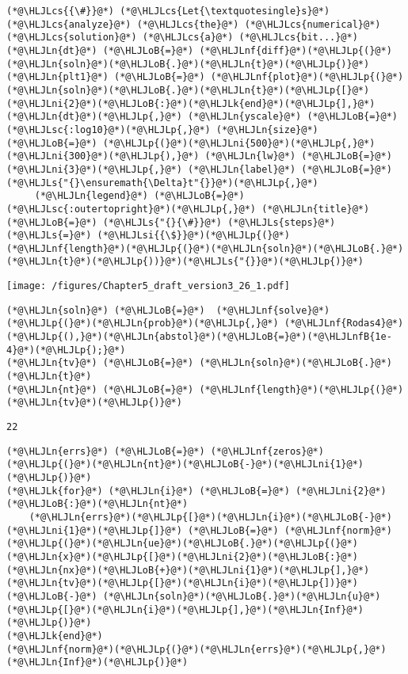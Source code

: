\documentclass[12pt,landscape]{article}
\newcommand{\HLJLk}[1]{\textcolor[RGB]{148,91,176}{\textbf{#1}}}
\newcommand{\HLJLn}[1]{#1}
\newcommand{\HLJLnf}[1]{\textcolor[RGB]{66,102,213}{#1}}
\newcommand{\HLJLs}[1]{\textcolor[RGB]{201,61,57}{#1}}
\newcommand{\HLJLsc}[1]{\textcolor[RGB]{201,61,57}{#1}}
\newcommand{\HLJLsi}[1]{#1}
\newcommand{\HLJLnfB}[1]{\textcolor[RGB]{59,151,46}{#1}}
\newcommand{\HLJLni}[1]{\textcolor[RGB]{59,151,46}{#1}}
\newcommand{\HLJLoB}[1]{\textcolor[RGB]{102,102,102}{\textbf{#1}}}
\newcommand{\HLJLp}[1]{#1}
\newcommand{\HLJLcs}[1]{\textcolor[RGB]{153,153,119}{\textit{#1}}}
\begin{document}
{\begin{lstlisting}
(*@\HLJLcs{{\#}}@*) (*@\HLJLcs{Let{\textquotesingle}s}@*) (*@\HLJLcs{analyze}@*) (*@\HLJLcs{the}@*) (*@\HLJLcs{numerical}@*) (*@\HLJLcs{solution}@*) (*@\HLJLcs{a}@*) (*@\HLJLcs{bit...}@*)
(*@\HLJLn{dt}@*) (*@\HLJLoB{=}@*) (*@\HLJLnf{diff}@*)(*@\HLJLp{(}@*)(*@\HLJLn{soln}@*)(*@\HLJLoB{.}@*)(*@\HLJLn{t}@*)(*@\HLJLp{)}@*)
(*@\HLJLn{plt1}@*) (*@\HLJLoB{=}@*) (*@\HLJLnf{plot}@*)(*@\HLJLp{(}@*)(*@\HLJLn{soln}@*)(*@\HLJLoB{.}@*)(*@\HLJLn{t}@*)(*@\HLJLp{[}@*)(*@\HLJLni{2}@*)(*@\HLJLoB{:}@*)(*@\HLJLk{end}@*)(*@\HLJLp{],}@*) (*@\HLJLn{dt}@*)(*@\HLJLp{,}@*) (*@\HLJLn{yscale}@*) (*@\HLJLoB{=}@*) (*@\HLJLsc{:log10}@*)(*@\HLJLp{,}@*) (*@\HLJLn{size}@*) (*@\HLJLoB{=}@*) (*@\HLJLp{(}@*)(*@\HLJLni{500}@*)(*@\HLJLp{,}@*) (*@\HLJLni{300}@*)(*@\HLJLp{),}@*) (*@\HLJLn{lw}@*) (*@\HLJLoB{=}@*) (*@\HLJLni{3}@*)(*@\HLJLp{,}@*) (*@\HLJLn{label}@*) (*@\HLJLoB{=}@*) (*@\HLJLs{"{}\ensuremath{\Delta}t"{}}@*)(*@\HLJLp{,}@*) 
     (*@\HLJLn{legend}@*) (*@\HLJLoB{=}@*) (*@\HLJLsc{:outertopright}@*)(*@\HLJLp{,}@*) (*@\HLJLn{title}@*) (*@\HLJLoB{=}@*) (*@\HLJLs{"{}{\#}}@*) (*@\HLJLs{steps}@*) (*@\HLJLs{=}@*) (*@\HLJLsi{{\$}}@*)(*@\HLJLp{(}@*)(*@\HLJLnf{length}@*)(*@\HLJLp{(}@*)(*@\HLJLn{soln}@*)(*@\HLJLoB{.}@*)(*@\HLJLn{t}@*)(*@\HLJLp{))}@*)(*@\HLJLs{"{}}@*)(*@\HLJLp{)}@*)
\end{lstlisting}

\texttt{[image: /figures/Chapter5\_draft\_version3\_26\_1.pdf]}

\begin{lstlisting}
(*@\HLJLn{soln}@*) (*@\HLJLoB{=}@*)  (*@\HLJLnf{solve}@*)(*@\HLJLp{(}@*)(*@\HLJLn{prob}@*)(*@\HLJLp{,}@*) (*@\HLJLnf{Rodas4}@*)(*@\HLJLp{(),}@*)(*@\HLJLn{abstol}@*)(*@\HLJLoB{=}@*)(*@\HLJLnfB{1e-4}@*)(*@\HLJLp{);}@*)
(*@\HLJLn{tv}@*) (*@\HLJLoB{=}@*) (*@\HLJLn{soln}@*)(*@\HLJLoB{.}@*)(*@\HLJLn{t}@*)
(*@\HLJLn{nt}@*) (*@\HLJLoB{=}@*) (*@\HLJLnf{length}@*)(*@\HLJLp{(}@*)(*@\HLJLn{tv}@*)(*@\HLJLp{)}@*)
\end{lstlisting}

\begin{lstlisting}
22
\end{lstlisting}


\begin{lstlisting}
(*@\HLJLn{errs}@*) (*@\HLJLoB{=}@*) (*@\HLJLnf{zeros}@*)(*@\HLJLp{(}@*)(*@\HLJLn{nt}@*)(*@\HLJLoB{-}@*)(*@\HLJLni{1}@*)(*@\HLJLp{)}@*)
(*@\HLJLk{for}@*) (*@\HLJLn{i}@*) (*@\HLJLoB{=}@*) (*@\HLJLni{2}@*)(*@\HLJLoB{:}@*)(*@\HLJLn{nt}@*)
    (*@\HLJLn{errs}@*)(*@\HLJLp{[}@*)(*@\HLJLn{i}@*)(*@\HLJLoB{-}@*)(*@\HLJLni{1}@*)(*@\HLJLp{]}@*) (*@\HLJLoB{=}@*) (*@\HLJLnf{norm}@*)(*@\HLJLp{(}@*)(*@\HLJLn{ue}@*)(*@\HLJLoB{.}@*)(*@\HLJLp{(}@*)(*@\HLJLn{x}@*)(*@\HLJLp{[}@*)(*@\HLJLni{2}@*)(*@\HLJLoB{:}@*)(*@\HLJLn{nx}@*)(*@\HLJLoB{+}@*)(*@\HLJLni{1}@*)(*@\HLJLp{],}@*)(*@\HLJLn{tv}@*)(*@\HLJLp{[}@*)(*@\HLJLn{i}@*)(*@\HLJLp{])}@*) (*@\HLJLoB{-}@*) (*@\HLJLn{soln}@*)(*@\HLJLoB{.}@*)(*@\HLJLn{u}@*)(*@\HLJLp{[}@*)(*@\HLJLn{i}@*)(*@\HLJLp{],}@*)(*@\HLJLn{Inf}@*)(*@\HLJLp{)}@*)
(*@\HLJLk{end}@*)
(*@\HLJLnf{norm}@*)(*@\HLJLp{(}@*)(*@\HLJLn{errs}@*)(*@\HLJLp{,}@*)(*@\HLJLn{Inf}@*)(*@\HLJLp{)}@*)
\end{lstlisting}

}
\end{document}
